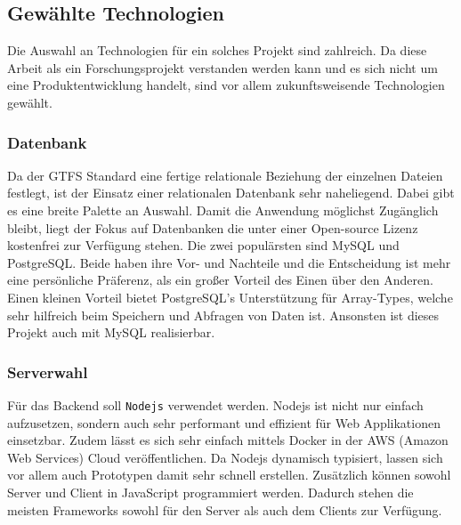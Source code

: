 \subsection{Gewählte Technologien}
\label{ssub:gewählte_technologien}
  Die Auswahl an Technologien für ein solches Projekt sind zahlreich. Da diese Arbeit als ein Forschungsprojekt verstanden werden kann und es sich nicht um eine Produktentwicklung handelt, sind vor allem zukunftsweisende Technologien gewählt.
  
  \subsubsection{Datenbank}
  \label{ssub:datenbank}
    Da der GTFS Standard eine fertige relationale Beziehung der einzelnen Dateien festlegt, ist der Einsatz einer relationalen Datenbank sehr naheliegend. Dabei gibt es eine breite Palette an Auswahl. Damit die Anwendung möglichst Zugänglich bleibt, liegt der Fokus auf Datenbanken die unter einer Open-source Lizenz kostenfrei zur Verfügung stehen. Die zwei populärsten sind MySQL und PostgreSQL\parencite{db_engines}. Beide haben ihre Vor- und Nachteile und die Entscheidung ist mehr eine persönliche Präferenz, als ein großer Vorteil des Einen über den Anderen. Einen kleinen Vorteil bietet PostgreSQL's Unterstützung für Array-Types, welche sehr hilfreich beim Speichern und Abfragen von Daten ist. Ansonsten ist dieses Projekt auch mit MySQL realisierbar.

  \subsubsection{Serverwahl}
  \label{ssub:serverwahl}
    Für das Backend soll \texttt{Nodejs} verwendet werden. Nodejs ist nicht nur einfach aufzusetzen, sondern auch sehr performant und effizient für Web Applikationen einsetzbar. Zudem lässt es sich sehr einfach mittels Docker in der AWS (Amazon Web Services) Cloud veröffentlichen. Da Nodejs dynamisch typisiert, lassen sich vor allem auch Prototypen damit sehr schnell erstellen. Zusätzlich können sowohl Server und Client in JavaScript programmiert werden. Dadurch stehen die meisten Frameworks sowohl für den Server als auch dem Clients zur Verfügung.
  
